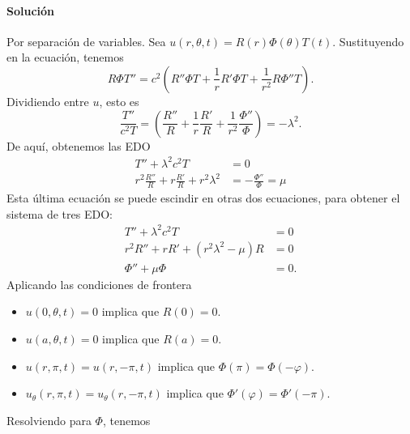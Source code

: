 \documentclass[11pt,letterpaper,draft]{report}
\newcommand\<{\langle}
\renewcommand\>{\rangle}
\renewcommand\phi\varphi
\begin{document}
\paragraph{Solución}
Por separación de variables.
Sea $u(r,\theta,t)=R(r)\Phi(\theta)T(t)$.
Sustituyendo en la ecuación, tenemos
\[
  R\Phi T''
  = c^{2}
  \left(R''\Phi T
  +\frac{1}{r}R'\Phi T
  +\frac{1}{r^{2}}R\Phi''T\right)
.\]
Dividiendo entre $u$, esto es
\[
  \frac{T''}{c^{2}T}
  =
  \left(
    \frac{R''}{R}
    +\frac{1}{r}\frac{R'}{R}
    +\frac{1}{r^{2}}\frac{\Phi''}{\Phi}
  \right)
  =-\lambda^{2}
.\]
De aquí, obtenemos las EDO
\begin{align*}
  T''+\lambda^{2}c^{2}T &= 0 \\
  r^{2}\frac{R''}{R}
  +r\frac{R'}{R}
  +r^{2}\lambda^{2}
  &=
  -\frac{\Phi''}{\Phi}
  = \mu
\end{align*}
Esta última ecuación se puede escindir en otras dos ecuaciones, para
obtener el sistema de tres EDO:
\begin{align*}
  T''+\lambda^{2}c^{2}T &= 0 \\
  r^{2}R'' +rR' +(r^{2}\lambda^{2}-\mu)R &= 0 \\
  \Phi'' +\mu\Phi &= 0.
\end{align*}
Aplicando las condiciones de frontera
\begin{itemize}
  \item
    $u(0,\theta,t)=0$ implica que $R(0)=0$.
  \item
    $u(a,\theta,t)=0$ implica que $R(a)=0$.
  \item
    $u(r,\pi,t)=u(r,-\pi,t)$ implica que $\Phi(\pi)=\Phi(-\phi)$.
  \item
    $u_\theta(r,\pi,t)=u_\theta(r,-\pi,t)$ implica que
    $\Phi'(\phi)=\Phi'(-\pi)$.
\end{itemize}
Resolviendo para $\Phi$, tenemos
\end{document}
